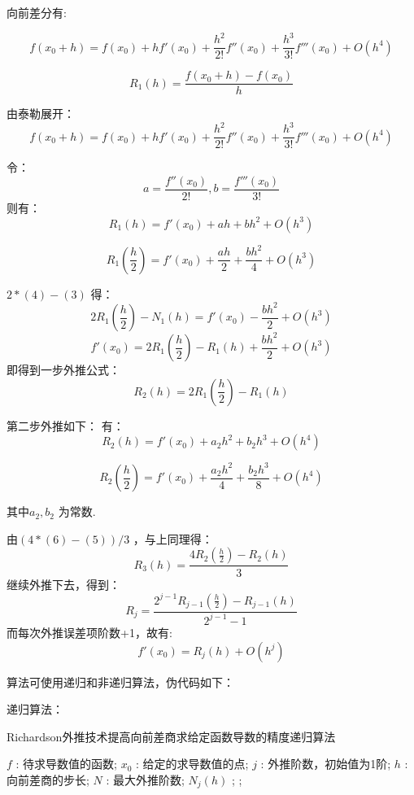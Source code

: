 \documentclass[12pt,a4paper,utf8]{ctexart}
\begin{document}
\begin{enumerate}
向前差分有:

$$
f(x_0+h)=f(x_0)+hf'(x_0)+\frac{h^2}{2!} f''(x_0)+\frac{h^3}{3!} f'''(x_0)+O(h^4)
$$

\begin{equation}
    R_1(h)=\frac{f(x_0+h)-f(x_0)}{h} 
    \end{equation}

由泰勒展开：
\begin{equation}
    f(x_0+h)=f(x_0)+hf'(x_0)+\frac{h^2}{2!} f''(x_0)+\frac{h^3}{3!} f'''(x_0)+O(h^4)
    \end{equation}

令：
$$
a=\frac{f''(x_0)}{2!} ,b=\frac{f'''(x_0)}{3!}  
$$
则有：
\begin{equation}
     R_1(h)=f'(x_0)+ah+bh^2+O(h^3)
\end{equation}

\begin{equation}
    R_1(\frac{h}{2} )=f'(x_0)+\frac{ah}{2} +\frac{bh^2}{4} +O(h^3)
\end{equation}

$ 2*(4)-(3) $ 得：
$$
2R_1(\frac{h}{2} )-N_1(h)=f'(x_0)-\frac{bh^2}{2} +O(h^3)
$$
$$
f'(x_0)=2R_1(\frac{h}{2} )-R_1(h)+\frac{bh^2}{2} +O(h^3)
$$
即得到一步外推公式：
$$
R_2(h)=2R_1(\frac{h}{2} )-R_1(h)
$$

第二步外推如下：
有：
\begin{equation}
    R_2(h)=f'(x_0)+a_2h^2+b_2h^3+O(h^4)
\end{equation}

\begin{equation}
    R_2(\frac{h}{2} )=f'(x_0)+\frac{a_2h^2}{4} +\frac{b_2h^3}{8} +O(h^4)
\end{equation}

其中$ a_2,b_2 $ 为常数.

由$ (4*(6)-(5))/3 $ ，与上同理得：
$$
R_3(h)=\frac{4R_2(\frac{h}{2})-R_2(h)}{3} 
$$
继续外推下去，得到：
$$
R_j=\frac{2^{j-1}R_{j-1}(\frac{h}{2} )-R_{j-1}(h)}{2^{j-1}-1} 
$$
而每次外推误差项阶数+1，故有:
$$
f'(x_0)=R_j(h)+O(h^j)
$$

算法可使用递归和非递归算法，伪代码如下：


递归算法：


\begin{algorithm}[H] 
    \caption{Richardson外推技术提高向前差商求给定函数导数的精度递归算法}  
    \label{alg1}
    \begin{algorithmic}[1] 
      \Require
       $ f $ : 待求导数值的函数;
       $ x_0 $ : 给定的求导数值的点;
       $ j $ : 外推阶数，初始值为1阶;  
       $ h $ : 向前差商的步长;  
       $ N $ : 最大外推阶数;
     \Ensure  
       $ N_j(h) $ 
        \State {};  
      \Else
        \State {};  
      \EndIf
      \EndFunction  
    \end{algorithmic}  
  \end{algorithm}  



\end{enumerate}
\end{document}
